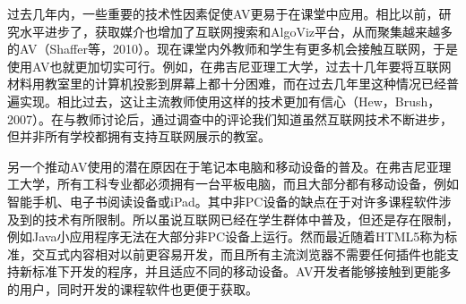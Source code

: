 \begin{sectext}
过去几年内，一些重要的技术性因素促使AV更易于在课堂中应用。相比以前，研究水平进步了，获取媒介也增加了互联网搜索和AlgoViz平台，从而聚集越来越多的AV（Shaffer等，2010）。现在课堂内外教师和学生有更多机会接触互联网，于是使用AV也就更加切实可行。例如，在弗吉尼亚理工大学，过去十几年要将互联网材料用教室里的计算机投影到屏幕上都十分困难，而在过去几年里这种情况已经普遍实现。相比过去，这让主流教师使用这样的技术更加有信心（Hew，Brush，2007）。在与教师讨论后，通过调查中的评论我们知道虽然互联网技术不断进步，但并非所有学校都拥有支持互联网展示的教室。

另一个推动AV使用的潜在原因在于笔记本电脑和移动设备的普及。在弗吉尼亚理工大学，所有工科专业都必须拥有一台平板电脑，而且大部分都有移动设备，例如智能手机、电子书阅读设备或iPad。其中非PC设备的缺点在于对许多课程软件涉及到的技术有所限制。所以虽说互联网已经在学生群体中普及，但还是存在限制，例如Java小应用程序无法在大部分非PC设备上运行。然而最近随着HTML5称为标准，交互式内容相对以前更容易开发，而且所有主流浏览器不需要任何插件也能支持新标准下开发的程序，并且适应不同的移动设备。AV开发者能够接触到更能多的用户，同时开发的课程软件也更便于获取。
\end{sectext}
